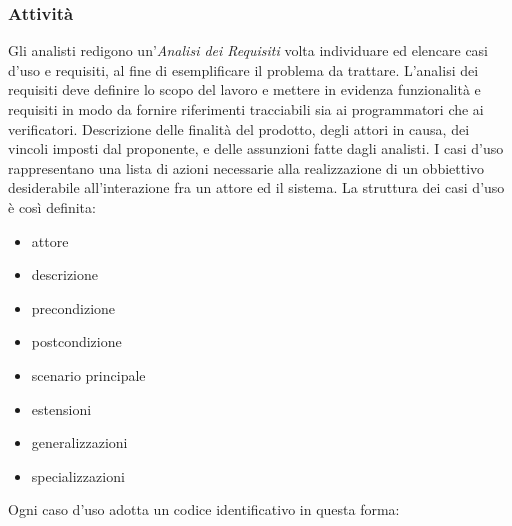 		\subsubsection{Attività}
		Gli analisti redigono un'\textit{Analisi dei Requisiti} volta  individuare ed elencare casi d'uso e requisiti, al fine di esemplificare il problema da trattare.
		L'analisi dei requisiti deve definire lo scopo del lavoro e mettere in evidenza funzionalità e requisiti in modo da fornire riferimenti tracciabili sia ai programmatori che ai verificatori.
		Descrizione delle finalità del prodotto, degli attori in causa, dei vincoli imposti dal proponente, e delle assunzioni fatte dagli analisti.
		I casi d'uso rappresentano una lista di azioni necessarie alla realizzazione di un obbiettivo desiderabile all'interazione fra un attore ed il sistema.
		La struttura dei casi d'uso è così definita:
		\begin{itemize}
		    \item attore
		    \item descrizione
		    \item precondizione
		    \item postcondizione
		    \item scenario principale
		    \item estensioni
		    \item generalizzazioni
		    \item specializzazioni
		\end{itemize}
		Ogni caso d'uso adotta un codice identificativo in questa forma:\\
		
